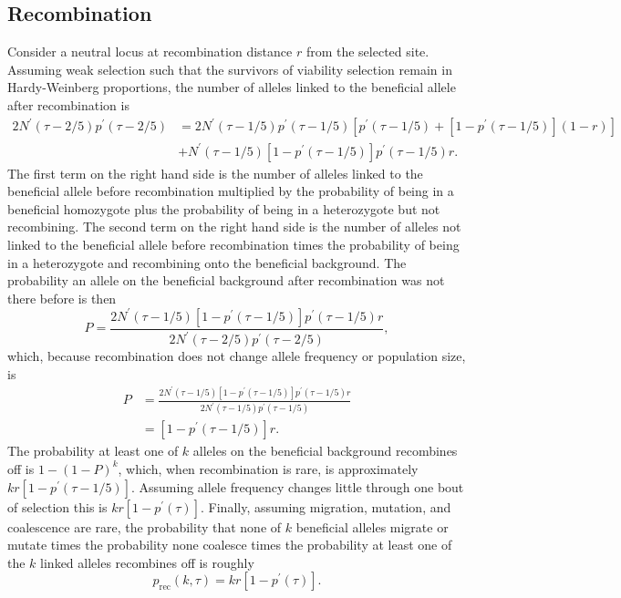 \documentclass[]{article}
\begin{document}
\subsection*{Recombination}
%
Consider a neutral locus at recombination distance $r$ from the selected site.
Assuming weak selection such that the survivors of viability selection remain in Hardy-Weinberg proportions, the number of alleles linked to the beneficial allele after recombination is
\begin{equation}
\begin{aligned}
2 N^\prime(\tau-2/5) p^\prime(\tau-2/5) &= 2 N^\prime(\tau-1/5) p^\prime(\tau-1/5) \left[p^\prime(\tau-1/5) + \left[1-p^\prime(\tau-1/5) \right] (1-r) \right]\\
 &+  N^\prime(\tau-1/5) [1-p^\prime(\tau-1/5)] p^\prime(\tau-1/5) r.
\end{aligned}
\end{equation}
The first term on the right hand side is the number of alleles linked to the beneficial allele before recombination multiplied by the probability of being in a beneficial homozygote plus the probability of being in a heterozygote but not recombining.
The second term on the right hand side is the number of alleles not linked to the beneficial allele before recombination times the probability of being in a heterozygote and recombining onto the beneficial background.
%
The probability an allele on the beneficial background after recombination was not there before is then
\begin{equation}
P = \frac{2 N^\prime(\tau-1/5) [1-p^\prime(\tau-1/5)] p^\prime(\tau-1/5) r}{2 N^\prime(\tau-2/5) p^\prime(\tau-2/5)},
\end{equation}
which, because recombination does not change allele frequency or population size, is
\begin{equation}
\begin{aligned}
P &= \frac{2 N^\prime(\tau-1/5) [1-p^\prime(\tau-1/5)] p^\prime(\tau-1/5) r}{2 N^\prime(\tau-1/5) p^\prime(\tau-1/5)}\\
&= [1-p^\prime(\tau-1/5)] r.
\end{aligned}
\end{equation}
The probability at least one of $k$ alleles on the beneficial background recombines off is $1-(1-P)^k$, which, when recombination is rare, is approximately $k r [1-p^\prime(\tau-1/5)]$.
Assuming allele frequency changes little through one bout of selection this is $k r [1-p^\prime(\tau)]$.
Finally, assuming migration, mutation, and coalescence are rare, the probability that none of $k$ beneficial alleles migrate or mutate times the probability none coalesce times the probability at least one of the $k$ linked alleles recombines off is roughly \citep[table 1 in][]{hudson1988coalescent}
\begin{equation}
p_\mathrm{rec}(k,\tau) = k r [1-p^\prime(\tau)].
\end{equation}
\end{document}
